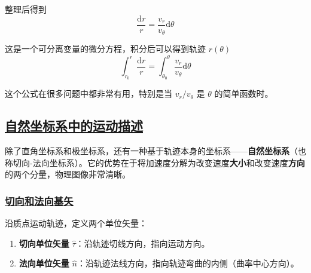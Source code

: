 整理后得到
\begin{equation}
    \frac{\mathrm{d}r}{r} = \frac{v_r}{v_\theta}\mathrm{d}\theta
\end{equation}

这是一个可分离变量的微分方程，积分后可以得到轨迹 $r(\theta)$
\begin{equation}
    \int_{r_0}^{r} \frac{\mathrm{d}r}{r} = \int_{\theta_0}^{\theta} \frac{v_r}{v_\theta}\mathrm{d}\theta
\end{equation}

这个公式在很多问题中都非常有用，特别是当 $v_r/v_\theta$ 是 $\theta$ 的简单函数时。

\subsection{\protect\hyperlink{:}{自然坐标系中的运动描述}}

除了直角坐标系和极坐标系，还有一种基于轨迹本身的坐标系——\textbf{自然坐标系}（也称切向-法向坐标系）。它的优势在于将加速度分解为改变速度\textbf{大小}和改变速度\textbf{方向}的两个分量，物理图像非常清晰。

\subsubsection{\protect\hyperlink{:}{切向和法向基矢}}

\begin{definition}[自然坐标系的基矢]
    沿质点运动轨迹，定义两个单位矢量：
    \begin{enumerate}
        \item \textbf{切向单位矢量} $\hat{\tau}$：沿轨迹切线方向，指向运动方向。
        \item \textbf{法向单位矢量} $\hat{n}$：沿轨迹法线方向，指向轨迹弯曲的内侧（曲率中心方向）。
    \end{enumerate}
\end{definition}

